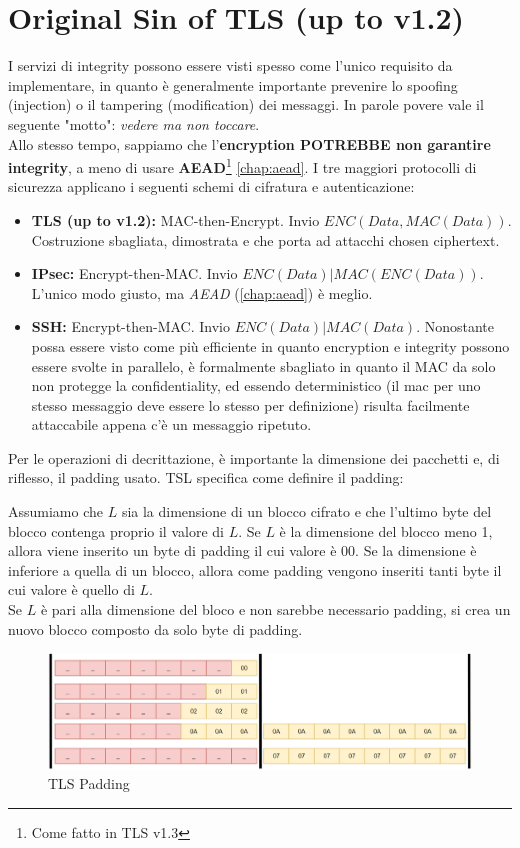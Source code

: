 \section{Original Sin of TLS (up to v1.2)}
I servizi di integrity possono essere visti spesso come l'unico requisito da implementare, in quanto è generalmente importante prevenire lo spoofing (injection) o il tampering (modification) dei messaggi. In parole povere vale il seguente "motto": \textit{vedere ma non toccare}.\\
Allo stesso tempo, sappiamo che l'\textbf{encryption POTREBBE non garantire integrity}, a meno di usare \textbf{AEAD}\footnote{Come fatto in TLS v1.3} \cref{chap:aead}. I tre maggiori protocolli di sicurezza applicano i seguenti schemi di cifratura e autenticazione:
\begin{itemize}
    \item \textbf{TLS (up to v1.2):} MAC-then-Encrypt. Invio $ENC(Data, MAC(Data))$. Costruzione sbagliata, dimostrata e che porta ad attacchi chosen ciphertext. 
    \item \textbf{IPsec:} Encrypt-then-MAC. Invio $ENC(Data)|MAC(ENC(Data))$. L'unico modo giusto, ma \textit{AEAD} (\cref{chap:aead}) è meglio.
    \item \textbf{SSH:} Encrypt-then-MAC. Invio $ENC(Data)|MAC(Data)$. Nonostante possa essere visto come più efficiente in quanto encryption e integrity possono essere svolte in parallelo, è formalmente sbagliato in quanto il MAC da solo non protegge la confidentiality, ed essendo deterministico (il mac per uno stesso messaggio deve essere lo stesso per definizione) risulta facilmente attaccabile appena c'è un messaggio ripetuto.
\end{itemize}
\begin{remark}
Per le operazioni di decrittazione, è importante la dimensione dei pacchetti e, di riflesso, il padding usato. TSL specifica come definire il padding:
\end{remark}
\begin{definition}
Assumiamo che $L$ sia la dimensione di un blocco cifrato e che l'ultimo byte del blocco contenga proprio il valore di $L$. Se $L$ è la dimensione del blocco meno 1, allora viene inserito un byte di padding il cui valore è $00$. Se la dimensione è inferiore a quella di un blocco, allora come padding vengono inseriti tanti byte il cui valore è quello di $L$.\\
Se $L$ è pari alla dimensione del bloco e non sarebbe necessario padding, si crea un nuovo blocco composto da solo byte di padding.
\end{definition}
\begin{figure}[h]
    \centering
    \includegraphics{image/tlspadding.png}
    \caption{TLS Padding}
    \label{fig:tlspadding}
\end{figure}
